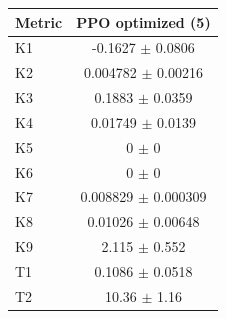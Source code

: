 \begin{tabular}{lc}
\toprule
Metric & PPO optimized (5) \\
\midrule
K1 & -0.1627 $\pm$ 0.0806 \\
K2 & 0.004782 $\pm$ 0.00216 \\
K3 & 0.1883 $\pm$ 0.0359 \\
K4 & 0.01749 $\pm$ 0.0139 \\
K5 & 0 $\pm$ 0 \\
K6 & 0 $\pm$ 0 \\
K7 & 0.008829 $\pm$ 0.000309 \\
K8 & 0.01026 $\pm$ 0.00648 \\
K9 & 2.115 $\pm$ 0.552 \\
T1 & 0.1086 $\pm$ 0.0518 \\
T2 & 10.36 $\pm$ 1.16 \\
\bottomrule
\end{tabular}
